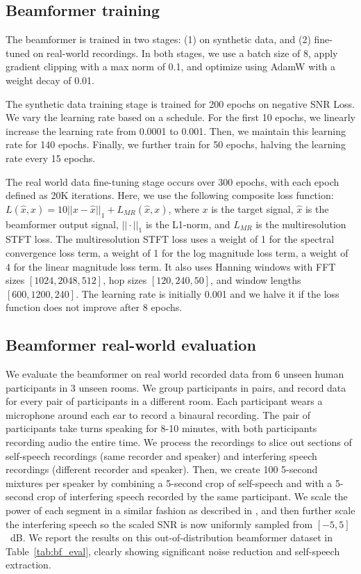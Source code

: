 
\subsection{Beamformer training }\label{sec:beamformertrainingdetails}

The beamformer is trained in two stages: (1) on synthetic data, and (2) fine-tuned on real-world recordings. In both stages, we use a batch size of 8, apply gradient clipping with a max norm of 0.1, and optimize using AdamW \cite{adamw} with a weight decay of 0.01.


The synthetic data training stage is trained for 200 epochs on  negative SNR Loss. We vary the learning rate based on a schedule. For the first 10 epochs, we linearly increase the learning rate from 0.0001 to 0.001. Then, we maintain this learning rate for 140 epochs. Finally, we further train for 50 epochs, halving the learning rate every 15 epochs.

The real world data fine-tuning stage occurs over 300 epochs, with each epoch defined as 20K iterations. Here, we use the following composite loss function:  $L(\hat{x}, x) = 10 ||x-\hat{x}||_1 + L_{MR}(\hat{x}, x)$, where $x$ is the target signal, $\hat{x}$ is the beamformer output signal, $||\cdot||_1$ is the L1-norm, and $L_{MR}$ is the multiresolution STFT loss. The multiresolution STFT loss uses a weight of 1 for the spectral convergence loss term, a weight of 1 for the log magnitude loss term, a weight of 4 for the linear magnitude loss term. It also uses Hanning windows with FFT sizes $[1024, 2048, 512]$, hop sizes $[120, 240, 50]$, and window lengths $[600,1200,240]$. The learning rate is initially 0.001 and we halve it if the loss function does not improve after 8 epochs.

\subsection{Beamformer real-world evaluation}\label{sec:beamformereval}
We evaluate the beamformer on real world recorded data from 6 unseen human participants in 3 unseen rooms. We group participants in pairs, and record data for every pair of participants in a different room. Each participant wears a microphone around each ear to record a binaural recording. The pair of participants take turns speaking for 8-10 minutes, with both participants recording audio the entire time. We process the recordings to slice out sections of self-speech recordings (same recorder and speaker) and interfering speech recordings (different recorder and speaker). Then, we create 100 5-second mixtures per speaker by combining a 5-second crop of self-speech and with a 5-second crop of interfering speech recorded by the same participant. We scale the power of each segment in a similar fashion as described in  , and then further scale the interfering speech so the scaled SNR is now uniformly sampled from $[-5, 5]$~dB. We report the results on this out-of-distribution beamformer dataset in Table~\ref{tab:bf_eval}, clearly showing significant noise reduction and self-speech extraction.

